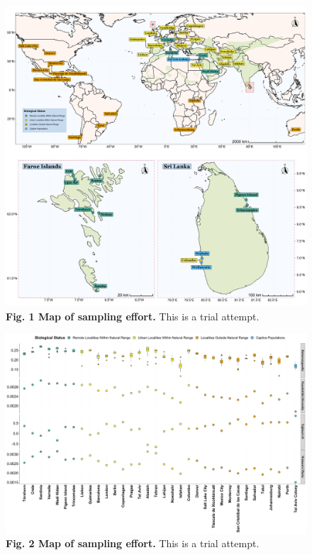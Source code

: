 \documentclass[twoside, british, a4paper]{article}
\begin{document}
\begin{figure}[!ht]
\centering
\includegraphics[width=1\textwidth]{../FPG--Plots/FPG--Map/FPG--Map.pdf}
\caption*{ \scriptsize \textbf{Fig. 1 Map of sampling effort.} This is a trial attempt.}
\label{MainText:FPGP--Map}
\end{figure}

\begin{figure}[!ht]
\centering
\includegraphics[width=1\textwidth]{../FPG--Plots/FPG--PopGenEstimates/FPG--PopGenEstimates.pdf}
\caption*{ \scriptsize \textbf{Fig. 2 Map of sampling effort.} This is a trial attempt.}
\label{MainText:FPGP--PopGenEstimates}
\end{figure}
\end{document}
